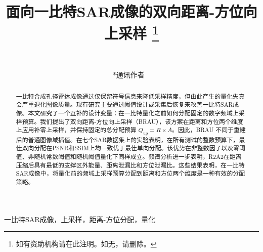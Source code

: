 \documentclass[conference]{IEEEtran}
\begin{document}
\title{面向一比特SAR成像的双向距离-方位向上采样
\thanks{如有资助机构请在此注明。如无，请删除。}
}

\author{
~\\
\and
{}
*通讯作者
~\\
\and
{}
}

\maketitle

\begin{abstract}
一比特合成孔径雷达成像通过仅保留符号信息来降低采样精度，但由此产生的量化失真会严重退化图像质量。现有研究主要通过阈值设计或采集后恢复来改善一比特SAR成像。本文研究了一个互补的设计变量：在一比特量化之前如何分配固定的数字频域上采样预算。我们提出了双向距离-方位向上采样（BRAU），该方案在距离和方位两个维度上应用补零上采样，并保持固定的总分配预算 $Q_{\mathrm{up}}=R\times A$。因此，BRAU 不同于重建后的普通图像域插值。在七个SAR数据集上的实验表明，在所有测试的整数预算下，最佳双向分配在PSNR和SSIM上均一致优于最佳单向分配。该优势在非整数因子以及零阈值、非随机常数阈值和随机阈值量化下同样成立。频谱分析进一步表明，R2A2在距离压缩后具有最低的支撑区外能量、距离泄漏比和方位泄漏比。这些结果表明，在一比特SAR成像中，将量化前的频域上采样预算分配到距离和方位两个维度是一种有效的分配策略。
\end{abstract}

\begin{IEEEkeywords}
一比特SAR成像，上采样，距离-方位分配，量化
\end{IEEEkeywords}
\end{document}
